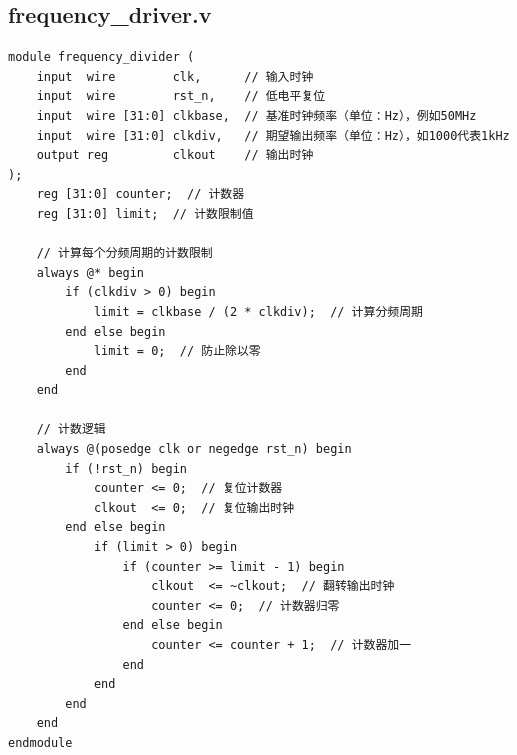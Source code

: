 \documentclass[a4paper,10pt]{article}
\begin{document}
\subsection{frequency_driver.v}
\begin{lstlisting}[caption=frequency_driver.v]
module frequency_divider (
    input  wire        clk,      // 输入时钟
    input  wire        rst_n,    // 低电平复位
    input  wire [31:0] clkbase,  // 基准时钟频率（单位：Hz），例如50MHz
    input  wire [31:0] clkdiv,   // 期望输出频率（单位：Hz），如1000代表1kHz
    output reg         clkout    // 输出时钟
);
    reg [31:0] counter;  // 计数器
    reg [31:0] limit;  // 计数限制值

    // 计算每个分频周期的计数限制
    always @* begin
        if (clkdiv > 0) begin
            limit = clkbase / (2 * clkdiv);  // 计算分频周期
        end else begin
            limit = 0;  // 防止除以零
        end
    end

    // 计数逻辑
    always @(posedge clk or negedge rst_n) begin
        if (!rst_n) begin
            counter <= 0;  // 复位计数器
            clkout  <= 0;  // 复位输出时钟
        end else begin
            if (limit > 0) begin
                if (counter >= limit - 1) begin
                    clkout  <= ~clkout;  // 翻转输出时钟
                    counter <= 0;  // 计数器归零
                end else begin
                    counter <= counter + 1;  // 计数器加一
                end
            end
        end
    end
endmodule

\end{lstlisting}
\end{document}
